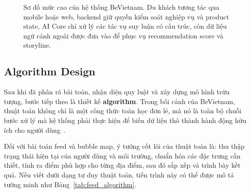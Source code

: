 \begin{figure}[H]
{
}
\caption{Sơ đồ mức cao của hệ thống BeVietnam. Du khách tương tác qua mobile hoặc web, backend giữ quyền kiểm soát nghiệp vụ và product state, AI Core chỉ xử lý các tác vụ suy luận có cấu trúc, còn dữ liệu ngữ cảnh ngoài được đưa vào để phục vụ recommendation score và storyline.}
\label{fig:bevietnam_high_level}
\end{figure}

\subsection{Algorithm Design}
\contrib

Sau khi đã phân rã bài toán, nhận diện quy luật và xây dựng mô hình trừu
tượng, bước tiếp theo là thiết kế \textbf{algorithm}. Trong bối cảnh của
BeVietnam, thuật toán không chỉ là một công thức toán học đơn lẻ, mà nó
là toàn bộ chuỗi bước xử lý mà hệ thống phải thực hiện để biến dữ liệu
thô thành hành động hữu ích cho người dùng~\cite{spronck2023}.

Đối với bài toán feed và bubble map, ý tưởng cốt lõi của thuật toán là:
thu thập trạng thái hiện tại của người dùng và môi trường, chuẩn hóa các
đặc trưng cần thiết, tính ra điểm phù hợp cho từng địa điểm, sau đó sắp
xếp và trình bày kết quả. Nếu viết dưới dạng tư duy thuật toán, tiến
trình này có thể được mô tả tường minh như Bảng~\ref{tab:feed_algorithm}.

